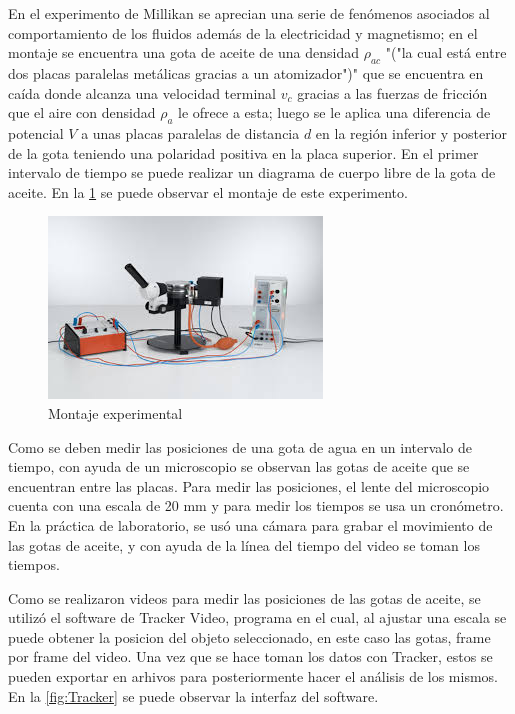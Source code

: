 En el experimento de Millikan se aprecian una serie de fenómenos asociados al 
comportamiento de los fluidos además de la electricidad y magnetismo; en el 
montaje se encuentra una gota de aceite de una densidad $\rho_{ac}$ "("la cual 
está entre dos placas paralelas metálicas gracias a un atomizador")" que se 
encuentra en caída donde alcanza una velocidad terminal $v_c$ gracias a las 
fuerzas de fricción que el aire con densidad $\rho_a$ le ofrece a esta; luego 
se le aplica una diferencia de potencial $V$ a unas placas paralelas de 
distancia $d$ en la región inferior y posterior de la gota teniendo una 
polaridad positiva en la placa superior. En el primer intervalo de tiempo se 
puede realizar un diagrama de cuerpo libre de la gota de aceite.
En la \cref{fig:Montaje} se puede observar el montaje de este experimento.

\begin{figure}[H]                                                               
    \centering                                                                  
    \includegraphics[width=0.35\linewidth]{./images/Montaje-Experimental.jpeg}      
    \caption{Montaje experimental}                                         
    \label{fig:Montaje}                                                         
\end{figure} 

Como se deben medir las posiciones de una gota de agua en un intervalo de 
tiempo, con ayuda de un microscopio se observan las gotas de aceite que se 
encuentran entre las placas. Para medir las posiciones, el lente del
microscopio cuenta con una escala de 20 mm y para medir los tiempos se usa un
cronómetro. En la práctica de laboratorio, se usó una cámara para grabar el 
movimiento de las gotas de aceite, y con ayuda de la línea del tiempo del video
se toman los tiempos.

Como se realizaron videos para medir las posiciones de las gotas de aceite, se 
utilizó el software de Tracker Video, programa en el cual, al ajustar una
escala se puede obtener la posicion del objeto seleccionado, en este caso las 
gotas, frame por frame del video. Una vez que se hace toman los datos con 
Tracker, estos se pueden exportar en arhivos para posteriormente hacer el 
análisis de los mismos. En la \cref{fig:Tracker} se puede observar la interfaz
del software.

